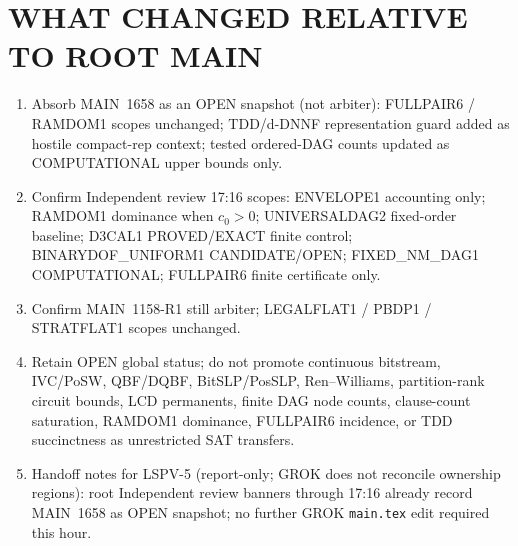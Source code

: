 \documentclass[11pt]{article}
\begin{document}
\section*{WHAT CHANGED RELATIVE TO ROOT MAIN}
\begin{enumerate}
\item Absorb MAIN~1658 as an OPEN snapshot (not arbiter): FULLPAIR6 / RAMDOM1
scopes unchanged; TDD/d-DNNF representation guard added as hostile compact-rep
context; tested ordered-DAG counts updated as COMPUTATIONAL upper bounds only.
\item Confirm Independent review 17:16 scopes: ENVELOPE1 accounting only;
RAMDOM1 dominance when $c_0>0$; UNIVERSALDAG2 fixed-order baseline;
D3CAL1 PROVED/EXACT finite control; BINARYDOF\_UNIFORM1 CANDIDATE/OPEN;
FIXED\_NM\_DAG1 COMPUTATIONAL; FULLPAIR6 finite certificate only.
\item Confirm MAIN~1158-R1 still arbiter; LEGALFLAT1 / PBDP1 / STRATFLAT1 scopes
unchanged.
\item Retain OPEN global status; do not promote continuous bitstream, IVC/PoSW,
QBF/DQBF, BitSLP/PosSLP, Ren--Williams, partition-rank circuit bounds, LCD
permanents, finite DAG node counts, clause-count saturation, RAMDOM1 dominance,
FULLPAIR6 incidence, or TDD succinctness as unrestricted SAT transfers.
\item Handoff notes for LSPV-5 (report-only; GROK does not reconcile ownership
regions): root Independent review banners through 17:16 already record MAIN~1658
as OPEN snapshot; no further GROK \texttt{main.tex} edit required this hour.
\end{enumerate}
\end{document}
